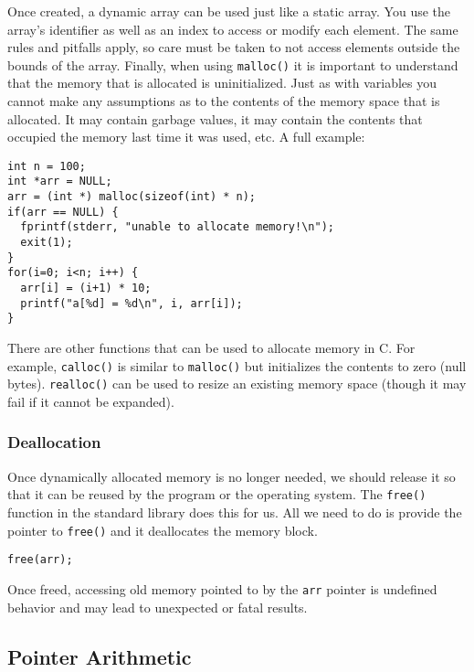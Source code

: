 Once created, a dynamic array can be used just like a static
array.  You use the array's identifier as well as an index to
access or modify each element.  The same rules and pitfalls
apply, so care must be taken to not access elements outside
the bounds of the array.  Finally, when using \texttt{malloc()}
it is important to understand that the memory that is allocated
is uninitialized.  Just as with variables you cannot make any
assumptions as to the contents of the memory space that is
allocated.  It may contain garbage values, it may contain the
contents that occupied the memory last time it was used, 
etc.  A full example:

\begin{verbatim}
int n = 100;
int *arr = NULL;
arr = (int *) malloc(sizeof(int) * n);
if(arr == NULL) {
  fprintf(stderr, "unable to allocate memory!\n");
  exit(1);
}
for(i=0; i<n; i++) {
  arr[i] = (i+1) * 10;
  printf("a[%d] = %d\n", i, arr[i]);
}
\end{verbatim}

There are other functions that can be used to allocate memory
in C.  For example, \texttt{calloc()} is similar to 
\texttt{malloc()} but initializes the contents
to zero (null bytes).  \texttt{realloc()} can be used to resize
an existing memory space (though it may fail if it cannot be 
expanded).  

\subsubsection{Deallocation}

Once dynamically allocated memory is no longer needed, we 
should release it so that it can be reused by the program or the
operating system.  The \texttt{free()} function in the
standard library does this for us.  All we need to do is provide
the pointer to \texttt{free()} and it deallocates the
memory block.

\begin{verbatim}
free(arr);
\end{verbatim}

Once freed, accessing old memory pointed to by the \texttt{arr}
pointer is undefined behavior and may lead to unexpected or fatal
results.  

\subsection{Pointer Arithmetic}


